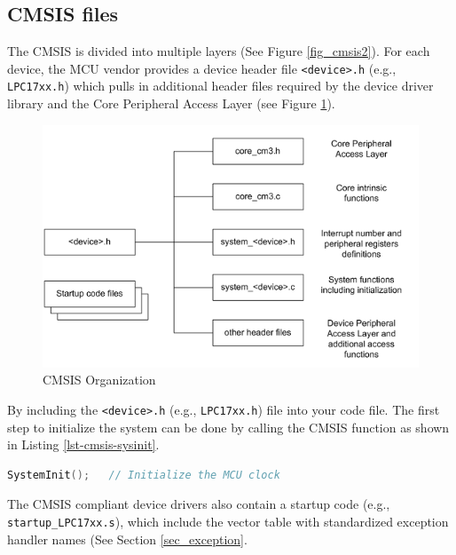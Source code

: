 \subsection{CMSIS files} 
The CMSIS is divided into multiple layers (See Figure \ref{fig_cmsis2}). 
For each device, the MCU vendor provides a device header file 
\verb|<device>.h| (e.g., \verb|LPC17xx.h|) which pulls in
additional header files required by the device driver library and 
the Core Peripheral Access Layer (see Figure \ref{fig_cmsis_file_org}).

\begin{figure}[ht]
\centerline{\includegraphics[width=5in]{figure/CMSIS_file_org}}
\caption[CMSIS Organization]{CMSIS Organization\cite{keil.mdk.primer}} 
\label{fig_cmsis_file_org}
\end{figure}

By including the \verb|<device>.h| (e.g., \verb|LPC17xx.h|)  file into 
your code file. The first step to initialize the system 
can be done by calling the CMSIS function as shown in Listing \ref{lst-cmsis-sysinit}.


\begin{lstlisting}[language=C, caption={CMSIS SystemInit()}, label=lst-cmsis-sysinit]
SystemInit();   // Initialize the MCU clock
\end{lstlisting}

The CMSIS compliant device drivers also contain a startup code 
(e.g., \verb|startup_LPC17xx.s|), which include the vector table 
with standardized exception handler names (See Section \ref{sec_exception}.

